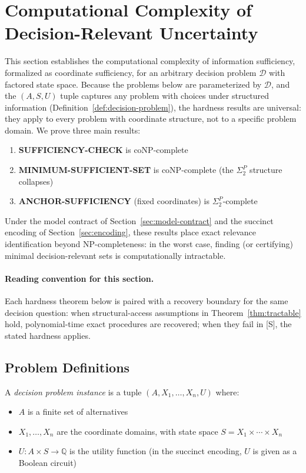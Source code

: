 \section{Computational Complexity of Decision-Relevant Uncertainty}
\label{sec:hardness}

This section establishes the computational complexity of information sufficiency, formalized as coordinate sufficiency, for an arbitrary decision problem $\mathcal{D}$ with factored state space. Because the problems below are parameterized by $\mathcal{D}$, and the $(A, S, U)$ tuple captures any problem with choices under structured information (Definition~\ref{def:decision-problem}), the hardness results are universal: they apply to every problem with coordinate structure, not to a specific problem domain. We prove three main results:

\begin{enumerate}
    \item \textbf{SUFFICIENCY-CHECK} is coNP-complete
    \item \textbf{MINIMUM-SUFFICIENT-SET} is coNP-complete (the $\Sigma_2^P$ structure collapses)
    \item \textbf{ANCHOR-SUFFICIENCY} (fixed coordinates) is $\Sigma_2^P$-complete
\end{enumerate}

Under the model contract of Section~\ref{sec:model-contract} and the succinct encoding of Section~\ref{sec:encoding}, these results place exact relevance identification beyond NP-completeness: in the worst case, finding (or certifying) minimal decision-relevant sets is computationally intractable.

\paragraph{Reading convention for this section.}
Each hardness theorem below is paired with a recovery boundary for the same decision question: when structural-access assumptions in Theorem~\ref{thm:tractable} hold, polynomial-time exact procedures are recovered; when they fail in [S], the stated hardness applies.

\subsection{Problem Definitions}

\begin{definition}
A \emph{decision problem instance} is a tuple $(A, X_1, \ldots, X_n, U)$ where:
\begin{itemize}
    \item $A$ is a finite set of alternatives
    \item $X_1, \ldots, X_n$ are the coordinate domains, with state space $S = X_1 \times \cdots \times X_n$
    \item $U: A \times S \to \mathbb{Q}$ is the utility function (in the succinct encoding, $U$ is given as a Boolean circuit)
\end{itemize}
\end{definition}

